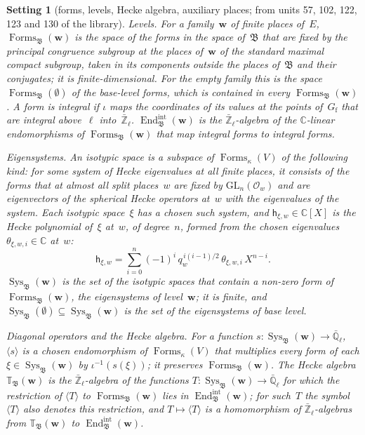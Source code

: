 \documentclass[11pt,a4paper]{article}
\newcommand{\kw}[1]{\emph{#1}}
\newcommand{\m}[1]{\mbox{$#1$}}        %
\theoremstyle{plainx}
\theoremstyle{uprightx}
\newtheorem{setting}[theorem]{Setting}          %
\newcommand{\CC}{\mathbb{C}}
\newcommand{\Zl}{\bar{\mathbb{Z}}_\ell}
\newcommand{\Ql}{\bar{\mathbb{Q}}_\ell}
\newcommand{\Gf}{G_{\mathrm{f}}}
\newcommand{\Ow}[1]{\mathcal{O}_{#1}}
\newcommand{\GL}{\mathrm{GL}}
\newcommand{\Forms}{\operatorname{Forms}}
\newcommand{\AllForms}{\operatorname{Forms}_{\kappa}(V)}
\newcommand{\Eint}{\operatorname{End}^{\mathrm{int}}}
\newcommand{\Sys}{\operatorname{Sys}}
\newcommand{\Hk}{\mathbb{T}}
\newcommand{\dg}[1]{\langle #1\rangle}
\newcommand{\hp}[2]{\mathsf{h}_{#1,#2}}
\newcommand{\fB}{\mathfrak{B}}
\newcommand{\bw}{\mathbf{w}}
\begin{document}
\begin{setting}[forms, levels, Hecke algebra, auxiliary places; from units 57, 102, 122, 123 and 130 of the
library]
\emph{Levels.} For a family~$\bw$ of finite places of~$E$, \m{\Forms_{\fB}(\bw)} is the space of the forms in the
space of~$\fB$ that are fixed by the principal congruence subgroup at the places of~$\bw$ of the standard maximal
compact subgroup, taken in its components outside the places of~$\fB$ and their conjugates; it is
finite-dimensional. For the empty family this is the space \m{\Forms_{\fB}(\emptyset)} of the \kw{base-level forms},
which is contained in every \m{\Forms_{\fB}(\bw)}. A form is \kw{integral} if $\iota$ maps the coordinates of its
values at the points of~\m{\Gf} that are integral above~$\ell$ into~$\Zl$. \m{\Eint_{\fB}(\bw)} is the $\Zl$-algebra
of the $\CC$-linear endomorphisms of \m{\Forms_{\fB}(\bw)} that map integral forms to integral forms.

\emph{Eigensystems.} An \kw{isotypic space} is a subspace of \m{\AllForms} of the following kind: for some system of
Hecke eigenvalues at all finite places, it consists of the forms that at almost all split places~$w$ are fixed by
\m{\GL_n(\Ow{w})} and are eigenvectors of the spherical Hecke operators at~$w$ with the eigenvalues of the system.
Each isotypic space~$\xi$ has a chosen such system, and \m{\hp{\xi}{w}\in\CC[X]} is the \kw{Hecke polynomial}
of~$\xi$ at~$w$, of degree~$n$, formed from the chosen eigenvalues \m{\theta_{\xi,w,i}\in\CC} at~$w$:
\[\hp{\xi}{w}=\sum_{i=0}^{n}(-1)^{i}\,q_w^{\,i(i-1)/2}\,\theta_{\xi,w,i}\,X^{n-i}.\]
\m{\Sys_{\fB}(\bw)} is the set of the isotypic spaces that contain a non-zero form of \m{\Forms_{\fB}(\bw)}, the
\kw{eigensystems of level~$\bw$}; it is finite, and \m{\Sys_{\fB}(\emptyset)\subseteq\Sys_{\fB}(\bw)} is the set of
the \kw{eigensystems of base level}.

\emph{Diagonal operators and the Hecke algebra.} For a function \m{s\colon\Sys_{\fB}(\bw)\to\Ql}, \m{\dg{s}} is a
chosen endomorphism of \m{\AllForms} that multiplies every form of each \m{\xi\in\Sys_{\fB}(\bw)} by
\m{\iota^{-1}(s(\xi))}; it preserves \m{\Forms_{\fB}(\bw)}. The \kw{Hecke algebra} \m{\Hk_{\fB}(\bw)} is the
$\Zl$-algebra of the functions \m{T\colon\Sys_{\fB}(\bw)\to\Ql} for which the restriction of \m{\dg{T}} to
\m{\Forms_{\fB}(\bw)} lies in \m{\Eint_{\fB}(\bw)}; for such~$T$ the symbol \m{\dg{T}} also denotes this restriction,
and \m{T\mapsto\dg{T}} is a homomorphism of $\Zl$-algebras from \m{\Hk_{\fB}(\bw)} to \m{\Eint_{\fB}(\bw)}.


\end{setting}
\end{document}
